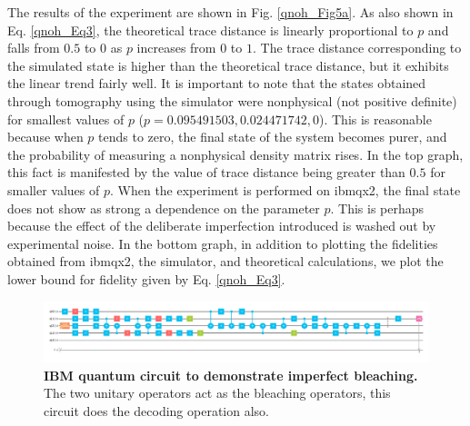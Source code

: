 The results of the experiment are shown in Fig. \ref{qnoh_Fig5a}. As also shown in Eq. \eqref{qnoh_Eq3}, the theoretical trace distance is linearly proportional to $p$ and falls from $0.5$ to $0$ as $p$ increases from $0$ to $1$. The trace distance corresponding to the simulated state is higher than the theoretical trace distance, but it exhibits the linear trend fairly well. It is important to note that the states obtained through tomography using the simulator were nonphysical (not positive definite) for smallest values of $p$ ($p=0.095491503,0.024471742,0$). This is reasonable because when $p$ tends to zero, the final state of the system becomes purer, and the probability of measuring a nonphysical density matrix rises. In the top graph, this fact is manifested by the value of trace distance being greater than $0.5$ for smaller values of $p$. When the experiment is performed on ibmqx2, the final state does not show as strong a dependence on the parameter $p$. This is perhaps because the effect of the deliberate imperfection introduced is washed out by experimental noise. In the bottom graph, in addition to plotting the fidelities obtained from ibmqx2, the simulator, and theoretical calculations, we plot the lower bound for fidelity given by Eq. \eqref{qnoh_Eq3}.   

\begin{figure}
\includegraphics[scale=.15]{qnoh_Fig5.png}
\caption{\textbf{IBM quantum circuit to demonstrate imperfect bleaching.} The two unitary operators act as the bleaching operators, this circuit does the decoding operation also.}
\label{qnoh_imperfect}
\end{figure}

